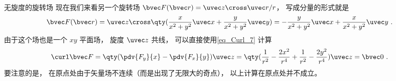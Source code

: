\begin{example}{无旋度的旋转场}
现在我们来看另一个旋转场 $\bvec F(\bvec r) = \uvec z\cross\uvec r /r$， 写成分量的形式就是
\begin{equation}
\bvec F(\bvec r) = \uvec z \cross \qty(\frac{x}{x^2 + y^2}\uvec x + \frac{y}{x^2 + y^2}\uvec y) = -\frac{y}{x^2 + y^2} \uvec x + \frac{x}{x^2 + y^2}\uvec y~.
\end{equation}
由于这个场也是一个 $xy$ 平面场， 旋度 $\uvec z$ 共线， 可以直接使用\autoref{eq_Curl_7} 计算
\begin{equation}
\curl\bvec F = \qty(\pdv{F_y}{x} - \pdv{F_x}{y})\uvec z = \qty(\frac{1}{r^2} - \frac{2x^2}{r^4} + \frac{1}{r^2} - \frac{2y^2}{r^4})\uvec z = \bvec 0~.
\end{equation}
要注意的是， 在原点处由于矢量场不连续（而是出现了无限大的奇点）， 以上计算在原点处并不成立。 
\end{example}

